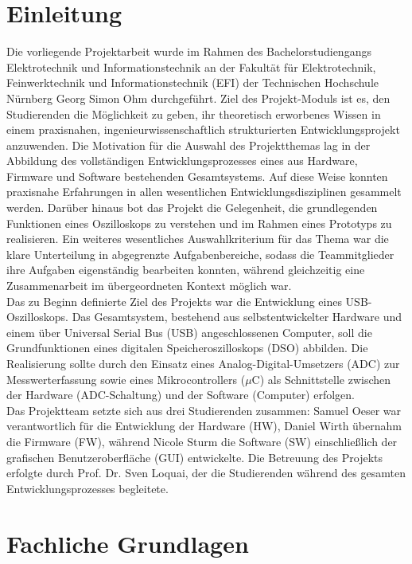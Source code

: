 \documentclass[a4paper, portrait, 12pt]{scrartcl} %
\begin{document}
\section{Einleitung}
Die vorliegende Projektarbeit wurde im Rahmen des Bachelorstudiengangs Elektrotechnik und Informationstechnik an der Fakultät für Elektrotechnik, Feinwerktechnik und Informationstechnik (EFI) der Technischen Hochschule Nürnberg Georg Simon Ohm durchgeführt. Ziel des Projekt-Moduls ist es, den Studierenden die Möglichkeit zu geben, ihr theoretisch erworbenes Wissen in einem praxisnahen, ingenieurwissenschaftlich strukturierten Entwicklungsprojekt anzuwenden. Die Motivation für die Auswahl des Projektthemas lag in der Abbildung des vollständigen Entwicklungsprozesses eines aus Hardware, Firmware und Software bestehenden Gesamtsystems. Auf diese Weise konnten praxisnahe Erfahrungen in allen wesentlichen Entwicklungsdisziplinen gesammelt werden. Darüber hinaus bot das Projekt die Gelegenheit, die grundlegenden Funktionen eines Oszilloskops zu verstehen und im Rahmen eines Prototyps zu realisieren. Ein weiteres wesentliches Auswahlkriterium für das Thema war die klare Unterteilung in abgegrenzte Aufgabenbereiche, sodass die Teammitglieder ihre Aufgaben eigenständig bearbeiten konnten, während gleichzeitig eine Zusammenarbeit im übergeordneten Kontext möglich war.\\

Das zu Beginn definierte Ziel des Projekts war die Entwicklung eines USB-Oszilloskops. Das Gesamtsystem, bestehend aus selbstentwickelter Hardware und einem über Universal Serial Bus (USB) angeschlossenen Computer, soll die Grundfunktionen eines digitalen Speicheroszilloskops (DSO) abbilden. Die Realisierung sollte durch den Einsatz eines Analog-Digital-Umsetzers (ADC) zur Messwerterfassung sowie eines Mikrocontrollers ($\mu$C) als Schnittstelle zwischen der Hardware (ADC-Schaltung) und der Software (Computer) erfolgen.\\

Das Projektteam setzte sich aus drei Studierenden zusammen: Samuel Oeser war verantwortlich für die Entwicklung der Hardware (HW), Daniel Wirth übernahm die Firmware (FW), während Nicole Sturm die Software (SW) einschließlich der grafischen Benutzeroberfläche (GUI) entwickelte. Die Betreuung des Projekts erfolgte durch Prof. Dr. Sven Loquai, der die Studierenden während des gesamten Entwicklungsprozesses begleitete.
\pagebreak

\section{Fachliche Grundlagen}
\end{document}
